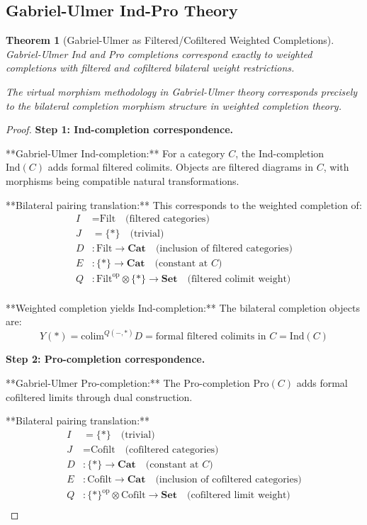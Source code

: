 \documentclass[11pt]{article}
\theoremstyle{plain}
\newtheorem{theorem}{Theorem}[section]
\theoremstyle{definition}
\theoremstyle{remark}
\newcommand{\op}{\mathrm{op}}
\newcommand{\colim}{\mathrm{colim}}
\begin{document}
\subsection{Gabriel-Ulmer Ind-Pro Theory}

\begin{theorem}[Gabriel-Ulmer as Filtered/Cofiltered Weighted Completions]\label{thm:gabriel-ulmer-correspondence}
Gabriel-Ulmer Ind and Pro completions \cite{gabriel1971lokal} correspond exactly to weighted completions with filtered and cofiltered bilateral weight restrictions.

The virtual morphism methodology in Gabriel-Ulmer theory corresponds precisely to the bilateral completion morphism structure in weighted completion theory.
\end{theorem}

\begin{proof}
\textbf{Step 1: Ind-completion correspondence.}

**Gabriel-Ulmer Ind-completion:** For a category $C$, the Ind-completion $\text{Ind}(C)$ adds formal filtered colimits. Objects are filtered diagrams in $C$, with morphisms being compatible natural transformations.

**Bilateral pairing translation:** This corresponds to the weighted completion of:
\begin{align}
I &= \text{Filt} \quad \text{(filtered categories)} \\
J &= \{*\} \quad \text{(trivial)} \\
D &: \text{Filt} \to \mathbf{Cat} \quad \text{(inclusion of filtered categories)} \\
E &: \{*\} \to \mathbf{Cat} \quad \text{(constant at } C \text{)} \\
Q &: \text{Filt}^{\op} \otimes \{*\} \to \mathbf{Set} \quad \text{(filtered colimit weight)} \\
\end{align}

**Weighted completion yields Ind-completion:** The bilateral completion objects are:
$$Y(*) = \colim^{Q(-, *)} D = \text{formal filtered colimits in } C = \text{Ind}(C)$$

\textbf{Step 2: Pro-completion correspondence.}

**Gabriel-Ulmer Pro-completion:** The Pro-completion $\text{Pro}(C)$ adds formal cofiltered limits through dual construction.

**Bilateral pairing translation:**
\begin{align}
I &= \{*\} \quad \text{(trivial)} \\
J &= \text{Cofilt} \quad \text{(cofiltered categories)} \\
D &: \{*\} \to \mathbf{Cat} \quad \text{(constant at } C \text{)} \\
E &: \text{Cofilt} \to \mathbf{Cat} \quad \text{(inclusion of cofiltered categories)} \\
Q &: \{*\}^{\op} \otimes \text{Cofilt} \to \mathbf{Set} \quad \text{(cofiltered limit weight)} \\
\end{align}


\end{proof}
\end{document}
